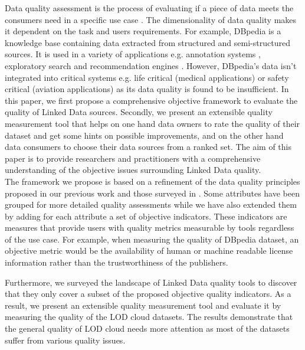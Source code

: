 \documentclass[onecolumn, crcready]{iosart2c}
\begin{document}
Data quality assessment is the process of evaluating if a piece of data meets the consumers need in a specific use case \cite{Bizer:2009:QIF:1482178.1482280}. The dimensionality of data quality makes it dependent on the task and users requirements. For example, DBpedia \cite{bizer_dbpedia_2009} is a knowledge base containing data extracted from structured and semi-structured sources. It is used in a variety of applications  e.g. annotation systems \cite{Mendes:2011:DSS:2063518.2063519}, exploratory search \cite{Marie:2013:DHO:2506182.2506185} and recommendation engines \cite{conf/iir/MirizziNROS12}. However, DBpedia's data isn't integrated into critical systems e.g. life critical (medical applications) or safety critical (aviation applications) as its data quality is found to be insufficient. In this paper, we first propose a comprehensive objective framework to evaluate the quality of Linked Data sources. Secondly, we present an extensible quality measurement tool that helps on one hand data owners to rate the quality of their dataset and get some hints on possible improvements, and on the other hand data consumers to choose their data sources from a ranked set. The aim of this paper is to provide researchers and practitioners with a comprehensive understanding of the objective issues surrounding Linked Data quality.\\

The framework we propose is based on a refinement of the data quality principles proposed in our previous work \cite{assaf2012} and those surveyed in \cite{Framework2012}. Some attributes have been grouped for more detailed quality assessments while we have also extended them by adding for each attribute a set of objective indicators. These indicators are measures that provide users with quality metrics measurable by tools regardless of the use case. For example, when measuring the quality of DBpedia dataset, an objective metric would be the availability of human or machine readable license information rather than the trustworthiness of the publishers.

Furthermore, we surveyed the landscape of Linked Data quality tools to discover that they only cover a subset of the proposed objective quality indicators. As a result, we present an extensible quality measurement tool and evaluate it by measuring the quality of the LOD cloud datasets. The results demonstrate that the general quality of LOD cloud needs more attention as most of the datasets suffer from various quality issues.\\
\end{document}
